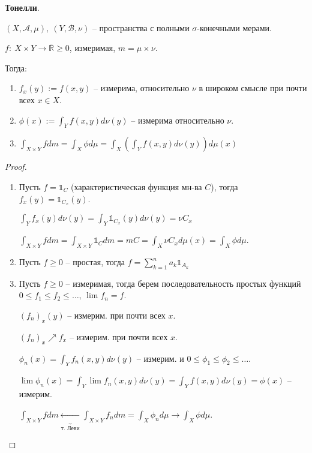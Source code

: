 \begin{theorem}
    \textbf{Тонелли}.

    $(X, \mathcal{A}, \mu), \ (Y, \mathcal{B}, \nu)$ -- пространства с полными $\sigma$-конечными мерами.

    $f: \ X \times Y \rightarrow \overline{\mathbb{R}} \geq 0$, измеримая, $m = \mu \times \nu$.

    Тогда: 
    \begin{enumerate}
        \item {
            $f_x(y) := f(x, y)$ -- измерима, относительно $\nu$ в широком смысле при почти всех $x \in X$.
        }
        \item {
            $\phi(x) := \int_Y { f(x, y) d \nu(y) }$ -- измерима относительно $\nu$.
        }
        \item {
            $\int_{X \times Y} {f d m} = \int_{X} {\phi d \mu} = \int_{X} {\left(\int_{Y} {f(x, y) d \nu(y)}\right) d \mu(x)}$
        }
    \end{enumerate}
\end{theorem}
\begin{proof}
    \begin{enumerate}
        \item {
            Пусть $f = \mathbb{1}_C$ (характеристическая функция мн-ва $C$), тогда $f_x(y) = \mathbb{1}_{C_x}(y)$.

            $\int_Y {f_x(y)d \nu(y)} = \int_Y {\mathbb{1}_{C_x}(y) d \nu(y)} = \nu C_{x}$

            $\int_{X \times Y} {f d m} = \int_{X \times Y} {\mathbb{1}_C d m} = m C = \int_X {\nu C_x d \mu(x)} = \int_X {\phi d \mu}$.
        }
        \item {
            Пусть $f \geq 0$ -- простая, тогда $f = \sum_{k=1}^{n} a_k \mathbb{1}_{A_k}$
        }
        \item {
            Пусть $f \geq 0$ -- измеримая, тогда берем последовательность простых функций $0 \leq f_1 \leq f_2 \leq \dots$, $\lim{f_n} = f$.

            $(f_n)_x(y)$ -- измерим. при почти всех $x$.

            $(f_n)_x \nearrow f_x$ -- измерим. при почти всех $x$.

            $\phi_n(x) = \int_Y {f_n(x, y) d \nu (y)}$ -- измерим. и $0 \leq \phi_1 \leq \phi_2 \leq \dots$.

            $\lim{\phi_n(x)} = \int_Y{\lim{f_n (x, y)} d \nu(y)} = \int_Y{f(x, y) d \nu(y)} = \phi(x)$ -- измерим.

            $\int_{X \times Y}{f d m} \underbrace{\leftarrow}_{\text{т. Леви}} \int_{X \times Y} {f_n d m} = \int_X {\phi_n d \mu} \rightarrow \int_X{\phi d \mu}$.
        }
    \end{enumerate}
\end{proof}


